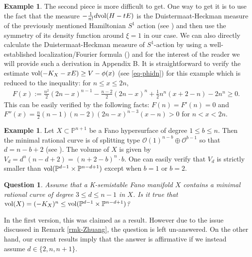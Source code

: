 \documentclass[12pt]{amsart}
\newtheorem{ques}[thm]{Question}
\theoremstyle{definition}
\newtheorem{ex}[thm]{Example}
\def\vol{{\rm vol}}
\newcommand{\IP}{{\mathbb P}}
\newcommand{\CO}{{\mathcal O}}
\begin{document}
\begin{ex}
    
    The second piece is more difficult to get. One way to get it is to use the fact that the measure $-\frac{1}{n!} d \vol(H-tE)$ is the Duistermaat-Heckman measure of the previously mentioned Hamiltonian $S^1$ action (see \cite{BHJ17}) and then use the symmetry of its density function around $\xi=1$ in our case. We can also directly calculate the Duistermaat-Heckman measure of $S^1$-action by using a well-established localization/Fourier formula (\cite[7.4]{BGV92}) and for the interest of the reader we will provide such a derivation in Appendix B. It is straightforward to verify the estimate $\vol(-K_X-xE)\ge V-\phi(x)$ (see \eqref{eq-phidn}) for this example which is reduced to the inequality: for $n\le x\le 2n$, 
    \begin{eqnarray*}
        F(x):=\frac{n^2}{2}(2n-x)^{n-1}-\frac{n-2}{2}(2n-x)^n+\frac{1}{2} n^n(x+2-n)- 2n^n\ge 0. 
    \end{eqnarray*}
    This can be easily verified by the following facts: $F(n)=F'(n)=0$ and $F''(x)=\frac{n}{2}(n-1)(n-2)(2n-x)^{n-3}(x-n)>0$ for $n<x<2n$. 
    
    
\end{ex}



\begin{ex} 
    Let $X\subset \IP^{n+1}$ be a Fano hypersurface of degree $1\le b\le n$. Then the minimal rational curve is of splitting type $\CO(1)^{n-b}\oplus \CO^{b-1}$ so that $d=n-b+2$ (see \cite[Exercise V.4.4]{Kol96}). The volume of $X$ is given by $V_d=d^n(n-d+2)=(n+2-b)^n\cdot b$. One can easily verify that $V_d$ is strictly smaller than $\vol(\IP^{d-1}\times \IP^{n-d+1})$ except when $b=1$ or $b=2$.  
\end{ex}

\begin{ques}
   Assume that a K-semistable Fano manifold $X$ contains a minimal rational curve of degree $3\le d\le n-1$ in $X$. Is it true that $\vol(X)=(-K_X)^n\le \vol(\IP^{d-1}\times \IP^{n-d+1})$? 
\end{ques}

In the first version, this was claimed as a result. However due to the issue discussed in Remark \ref{rmk-Zhuang}, the question is left un-answered. 
 On the other hand, our current results imply that the answer is affirmative if we instead assume $d\in \{2,n,n+1 \}$. 
\end{document}
